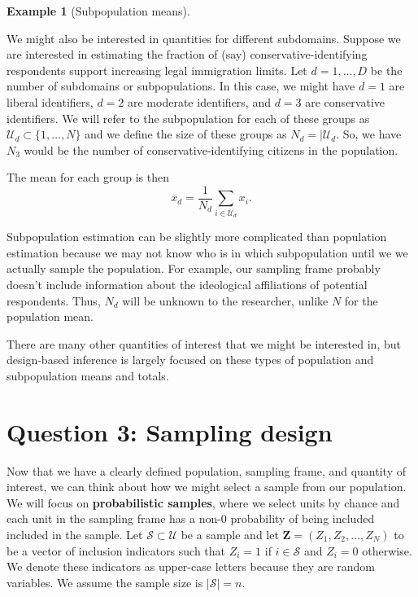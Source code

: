 \documentclass[
  letterpaper,
  DIV=11,
  numbers=noendperiod]{scrreprt}
\newcommand{\mb}{\symbf}
\theoremstyle{definition}
\newtheorem{example}{Example}[chapter]
\theoremstyle{definition}
\theoremstyle{plain}
\theoremstyle{remark}
\begin{document}
\begin{example}[Subpopulation
means]\protect\hypertarget{exm-subpopulation}{}\label{exm-subpopulation}

We might also be interested in quantities for different subdomains.
Suppose we are interested in estimating the fraction of (say)
conservative-identifying respondents support increasing legal
immigration limits. Let \(d= 1, \ldots, D\) be the number of subdomains
or subpopulations. In this case, we might have \(d = 1\) are liberal
identifiers, \(d = 2\) are moderate identifiers, and \(d = 3\) are
conservative identifiers. We will refer to the subpopulation for each of
these groups as \(\mathcal{U}_d \subset \{1,\ldots, N\}\) and we define
the size of these groups as \(N_d = |\mathcal{U}_d\). So, we have
\(N_3\) would be the number of conservative-identifying citizens in the
population.

The mean for each group is then \[
\overline{x}_d = \frac{1}{N_d} \sum_{i \in \mathcal{U}_d} x_i.
\]

Subpopulation estimation can be slightly more complicated than
population estimation because we may not know who is in which
subpopulation until we we actually sample the population. For example,
our sampling frame probably doesn't include information about the
ideological affiliations of potential respondents. Thus, \(N_d\) will be
unknown to the researcher, unlike \(N\) for the population mean.

\end{example}

There are many other quantities of interest that we might be interested
in, but design-based inference is largely focused on these types of
population and subpopulation means and totals.

\hypertarget{question-3-sampling-design}{%
\section{Question 3: Sampling design}\label{question-3-sampling-design}}

Now that we have a clearly defined population, sampling frame, and
quantity of interest, we can think about how we might select a sample
from our population. We will focus on \textbf{probabilistic samples},
where we select units by chance and each unit in the sampling frame has
a non-0 probability of being included included in the sample. Let
\(\mathcal{S} \subset \mathcal{U}\) be a sample and let
\(\mb{Z} = (Z_1, Z_2, \ldots, Z_N)\) to be a vector of inclusion
indicators such that \(Z_i = 1\) if \(i \in \mathcal{S}\) and
\(Z_i = 0\) otherwise. We denote these indicators as upper-case letters
because they are random variables. We assume the sample size is
\(|\mathcal{S}| = n\).
\end{document}

